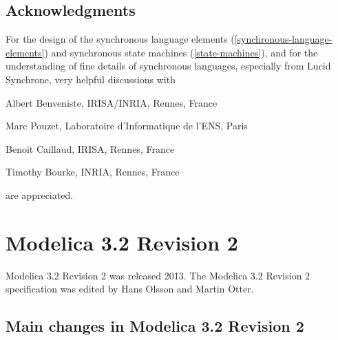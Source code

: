 \subsection{Acknowledgments}\label{acknowledgments1}

For the design of the synchronous language elements (\cref{synchronous-language-elements}) and
synchronous state machines (\cref{state-machines}), and for the understanding of
fine details of synchronous languages, especially from Lucid Synchrone,
very helpful discussions with
\begin{contributors}
\item Albert Benveniste, IRISA/INRIA, Rennes, France
\item Marc Pouzet, Laboratoire d'Informatique de l'ENS, Paris
\item Benoit Caillaud, IRISA, Rennes, France
\item Timothy Bourke, INRIA, Rennes, France
\end{contributors}
are appreciated.

\section{Modelica 3.2 Revision 2}\label{modelica-3-2-revision-2}

Modelica 3.2 Revision 2 was released 2013. The Modelica 3.2 Revision 2
specification was edited by Hans Olsson and Martin Otter.

\subsection{Main changes in Modelica 3.2 Revision 2}\label{main-changes-in-modelica-3-2-revision-2}

